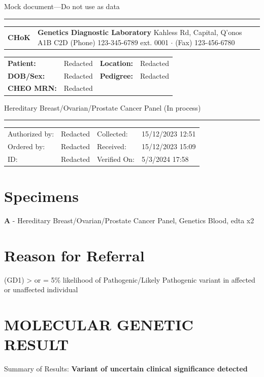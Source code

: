\documentclass[9pt]{extarticle}
\begin{document}
\begin{center}{\large Mock document---Do not use as data}\hrule\end{center}


\begin{tabular}{p{2cm} >{\centering\arraybackslash}p{11.59cm} p{2cm}}
{\Huge \bf CHoK} & {\bf Genetics Diagnostic Laboratory} \newline
123 Kahless Rd, Capital, Q'onos A1B C2D \newline
(Phone) 123-345-6789 ext. 0001 $\cdot$ (Fax) 123-456-6780 & \\
\end{tabular}

\begin{tabular}{p{2cm} p{5.75cm} p{2cm} p{5.75cm}}
{\bf Patient:} & Redacted & {\bf Location:} & Redacted \\
{\bf DOB/Sex:} & Redacted & {\bf Pedigree:} & Redacted\\
{\bf CHEO MRN:} & Redacted & & \\
\end{tabular}

Hereditary Breast/Ovarian/Prostate Cancer Panel (In process) 
\hrule
\begin{tabular}{p{2cm} p{5.75cm} p{2cm} p{5.75cm}}
Authorized by: & Redacted & Collected: & 15/12/2023 12:51 \\
Ordered by: & Redacted & Received: & 15/12/2023 15:09 \\
ID: & Redacted & Verified On: & 5/3/2024 17:58 \\
\end{tabular}

\section*{Specimens}
{\bf A} -  Hereditary Breast/Ovarian/Prostate Cancer Panel, Genetics Blood, edta x2

\section*{Reason for Referral}
(GD1) > or = 5\% likelihood of Pathogenic/Likely Pathogenic variant in affected or unaffected individual

\section*{MOLECULAR GENETIC RESULT}
Summary of Results: {\bf Variant of uncertain clinical significance detected}
\end{document}
